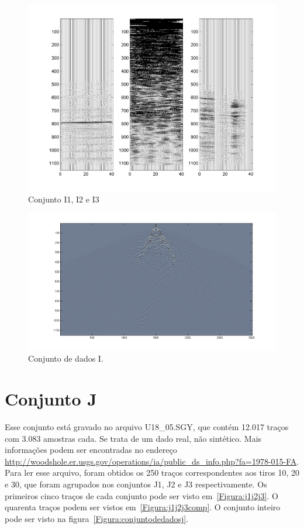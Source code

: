 \begin{figure}[!h]
\centering
\includegraphics[scale=1.01]{fig/fig_I2.png}
\caption{Conjunto I1, I2 e I3}
\label{Figura:i1i2i3comp}
\end{figure}

\begin{figure}[!h]
\centering
\includegraphics[scale=1]{fig/over_img_i.png}
\caption{Conjunto de dados I.}
\label{Figura:conjuntodedadosi}
\end{figure}

\section{Conjunto J}

Esse conjunto está gravado no arquivo U18\_05.SGY, que contém 12.017 traços com
3.083 amostras cada. Se trata de um dado real, não sintético. Mais informações
podem ser encontradas no endereço
\url{http://woodshole.er.usgs.gov/operations/ia/public_ds_info.php?fa=1978-015-FA}.
Para ler esse arquivo, foram obtidos os 250 traços correspondentes aos
tiros 10, 20 e 30, que foram agrupados nos conjuntos J1, J2 e J3
respectivamente. Os primeiros cinco traços de cada conjunto pode ser
visto em~\ref{Figura:j1j2j3}. O quarenta traços podem ser vistos
em~\ref{Figura:j1j2j3comp}. O conjunto inteiro pode ser visto na
figura~\ref{Figura:conjuntodedadosj}.

